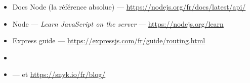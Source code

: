 \begin{ressources}
\begin{itemize}
  \item Docs Node (la r\'ef\'erence absolue) --- \url{https://nodejs.org/fr/docs/latest/api/}
  \item Node --- \emph{Learn JavaScript on the server} --- \url{https://nodejs.org/learn}
  \item Express guide --- \url{https://expressjs.com/fr/guide/routing.html}
  \item {}
  \item {} --- et \url{https://snyk.io/fr/blog/}
\end{itemize}
\end{ressources}

